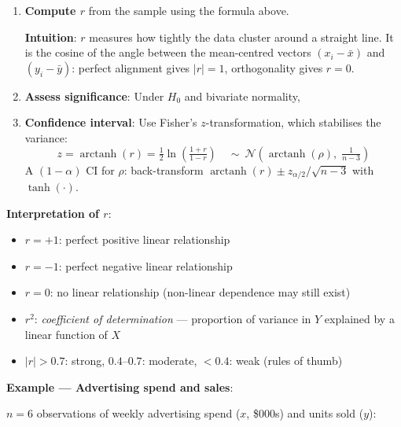 \begin{enumerate}
    \item \textbf{Compute $r$} from the sample using the formula above.

        \textbf{Intuition}: $r$ measures how tightly the data cluster around a straight
        line. It is the cosine of the angle between the mean-centred vectors
        $(x_i - \bar{x})$ and $(y_i - \bar{y})$: perfect alignment gives $|r| = 1$,
        orthogonality gives $r = 0$.

    \item \textbf{Assess significance}: Under $H_0$ and bivariate normality,
        \begin{center}
        \end{center}

    \item \textbf{Confidence interval}: Use Fisher's $z$-transformation, which
        stabilises the variance:
        $$z = \operatorname{arctanh}(r) = \tfrac{1}{2}\ln\!\left(\tfrac{1+r}{1-r}\right)
          \quad \sim\ \mathcal{N}\!\left(\operatorname{arctanh}(\rho),\;\tfrac{1}{n-3}\right)$$
        A $(1-\alpha)$ CI for $\rho$: back-transform
        $\operatorname{arctanh}(r) \pm z_{\alpha/2}/\sqrt{n-3}$ with $\tanh(\cdot)$.
\end{enumerate}

\textbf{Interpretation of $r$}:
\begin{itemize}
    \item $r = +1$: perfect positive linear relationship
    \item $r = -1$: perfect negative linear relationship
    \item $r = 0$: no linear relationship (non-linear dependence may still exist)
    \item $r^2$: \emph{coefficient of determination} — proportion of variance in $Y$
        explained by a linear function of $X$
    \item $|r| > 0.7$: strong, $0.4$--$0.7$: moderate, $< 0.4$: weak (rules of thumb)
\end{itemize}

\textbf{Example — Advertising spend and sales}:

$n = 6$ observations of weekly advertising spend ($x$, \$000s) and units sold ($y$):

